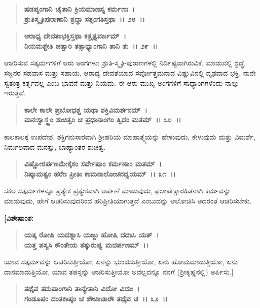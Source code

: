 \begin{verse}
\textbf{ಷಡಪ್ಯಂಗಾನಿ ಚೈತಾನಿ ಕ್ರಿಯಮಾಣಸ್ಯ ಕರ್ಮಣಃ~।}\\\textbf{ಶ್ರುತಿಸ್ಮೃತಿಪುರಾಣಾನಿ ಶ್ರದ್ಧಾ ಸತ್ಸಂಗತಿಸ್ತಥಾ~।। ೨೮~।। }
\end{verse}

\begin{verse}
\textbf{ಆರಾಧ್ಯ ದೇವತಾಭಕ್ತಿಸ್ತಥಾ ಕತ್ರೃತ್ವವರ್ಜಮ್~।}\\\textbf{ನಿಯಮಶ್ಚೇತಿ ಚತ್ವಾರಿ ತತ್ಸಾಧ್ಯಾಂಗಾನಿ ತಾನಿ ತು~।। ೨೯~।।}
\end{verse}

ಆಚರಿಸುವ ಸತ್ಕರ್ಮಗಳಿಗೆ ಆರು ಅಂಗಗಳು: ಶ್ರುತಿ-ಸ್ಮೃತಿ-ಪುರಾಣಗಳಲ್ಲಿ ನಿರ್ದಿಷ್ಟವಾಗಿರುವಿಕೆ, ಮಾಡುವಲ್ಲಿ ಶ್ರದ್ಧೆ, ಸಜ್ಜನರ ಸಹವಾಸ ಮತ್ತು ಸಹಾಯ, ಆರಾಧ್ಯ ದೇವತೆಯಾದ ಸರ್ವೋತ್ತಮನಾದ ವಿಷ್ಣುವಿನಲ್ಲಿ ದೃಢವಾದ ಭಕ್ತಿ, ನಾನೇ ಸ್ವತಂತ್ರ ಕರ್ತೃವಲ್ಲ ಎಂಬ ಭಾವನೆ ಮತ್ತು ನಿಯಮ. ಈ ಆರು ಮುಖ್ಯ ಅಂಗಗಳಿಗೆ ಸಾಧ್ಯಾಂಗಗಳೆಂದು ನಾಲ್ಕು ಇರುತ್ತವೆ.

\begin{verse}
\textbf{ಕಾಲೇ ಕಾಲೇ ಪ್ರಬೋಧಶ್ಚ ಯಥಾ ಶಕ್ತಿವಿಮರ್ಶನಮ್~।}\\\textbf{ಮನಃಸ್ವಾಸ್ಥ್ಯಂ ಶುಚಿತ್ವಂ ಚ ಪ್ರಧಾನಾಂಗಂ ತ್ವಿದಂ ಮತಮ್~।। ೩೦~।।}
\end{verse}

ಕಾಲಕಾಲಕ್ಕೆ ಉಪದೇಶ, ಶಕ್ತಿಗನುಸಾರವಾಗಿ ಶ‍್ರೀಹರಿಯ ಮಾಹಾತ್ಮ್ಯೆಯನ್ನು ಹೇಳುವುದು, ಕೇಳುವುದು ಮತ್ತು ವಿಮರ್ಶೆ, ನಿರ್ಮಲವಾದ ಮನಸ್ಸು, ಬಾಹ್ಯಾಂತರ ಶುಚಿತ್ವ.

\begin{verse}
\textbf{ವಿಷ್ಣೋರರ್ಪಣಮೇಕೈಕಂ ಸರ್ವೇಷಾಂ ಕರ್ಮಣಾಂ ಮತಮ್~।}\\\textbf{ನಿಷ್ಕಾಮತ್ವಂ ಹರೇಃ ಪ್ರೀತಿಃ ಕಾಮನಾಲೋಚನದ್ವಯಮ್~।। ೩೧~।।}
\end{verse}

ಸಕಲ ಸತ್ಕರ್ಮಗಳನ್ನೂ ಪ್ರತ್ಯೇಕ ಪ್ರತ್ಯೇಕವಾಗಿ ಅರ್ಪಣೆ ಮಾಡುವುದು, ಫಲಾಪೇಕ್ಷಾರಹಿತನಾಗಿ ಕರ್ಮವನ್ನು ಮಾಡುವುದು, ಹೇಗೆ ಆಚರಿಸುವುದರಿಂದ ಹರಿಪ್ರೀತಿಯಾಗುತ್ತದೆ ಎಂಬುದನ್ನು ಆಲೋಚಿಸಿ ಅದರಂತೆ ಆಚರಿಸಬೇಕು.

\begin{flushleft}
\textbf{[ವಿಶೇಷಾಂಶ:}
\end{flushleft}

\begin{verse}
\textbf{ಯತ್ಕ ರೋಷಿ ಯದಶ್ನಾಸಿ ಯಜ್ಜು ಹೋಷಿ ದದಾಸಿ ಯತ್~।}\\\textbf{ಯತ್ತ ಪಸ್ಯಸಿ ಕೌಂತೇಯ ತತ್ಕುರುಷ್ವ ಮದರ್ಪಣಮ್~।।} 
\end{verse}

ಯಾವ ಸತ್ಕರ್ಮವನ್ನು ಆಚರಿಸುತ್ತೀಯೋ, ಏನನ್ನು ಭುಂಜಿಸುತ್ತೀಯೋ, ಏನು ಹೋಮಮಾಡುತ್ತಿಯೋ, ಏನು ದಾನಮಾಡುತ್ತಿಯೋ, ಯಾವ ತಪಸ್ಸನ್ನು ಆಚರಿಸುತ್ತೀಯೋ ಅವೆಲ್ಲವನ್ನೂ ನನಗೆ (ಶ‍್ರೀಕೃಷ್ಣನಲ್ಲಿ) ಅರ್ಪಿಸು.]

\begin{verse}
\textbf{ತಥೈವ ತದುಪಾಂಗಾನಿ ತಾನ್ಯೇತಾನಿ ವಿದೋ ವಿದುಃ~।}\\\textbf{ಗಂಡೂಷಂ ದಂತಕಾಷ್ಠಂ ಚ ಶೌಚಾಚಾರೌ ತಥೈವ ಚ~।। ೩೨~।।}
\end{verse}

